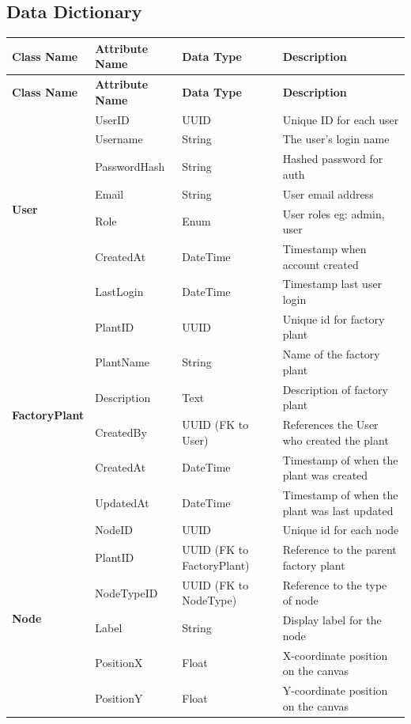 \documentclass[12pt]{article}
\begin{document}
\subsection{Data Dictionary}
\begin{longtable}{|p{3.5cm}|p{3.25cm}|p{2cm}|p{6cm}|}
  \hline
  \textbf{Class Name} & \textbf{Attribute Name} & \textbf{Data Type} & \textbf{Description} \\
  \hline
  \endfirsthead
  
  \hline
  \textbf{Class Name} & \textbf{Attribute Name} & \textbf{Data Type} & \textbf{Description} \\
  \hline
  \endhead
  
  \multirow{7}{*}{\textbf{User}} & UserID & UUID & Unique ID for each user \\
  \cline{2-4}
  & Username & String & The user’s login name \\
  \cline{2-4}
  & PasswordHash & String & Hashed password for auth \\
  \cline{2-4}
  & Email & String & User email address \\
  \cline{2-4}
  & Role & Enum & User roles eg: admin, user \\
  \cline{2-4}
  & CreatedAt & DateTime & Timestamp when account created \\
  \cline{2-4}
  & LastLogin & DateTime & Timestamp last user login \\
  \hline
  
  \multirow{6}{*}{\textbf{FactoryPlant}} & PlantID & UUID & Unique id for factory plant \\
  \cline{2-4}
  & PlantName & String & Name of the factory plant \\
  \cline{2-4}
  & Description & Text & Description of factory plant \\
  \cline{2-4}
  & CreatedBy & UUID (FK to User) & References the User who created the plant \\
  \cline{2-4}
  & CreatedAt & DateTime & Timestamp of when the plant was created \\
  \cline{2-4}
  & UpdatedAt & DateTime & Timestamp of when the plant was last updated \\
  \hline
  
  \multirow{6}{*}{\textbf{Node}} & NodeID & UUID & Unique id for each node \\
  \cline{2-4}
  & PlantID & UUID (FK to FactoryPlant) & Reference to the parent factory plant \\
  \cline{2-4}
  & NodeTypeID & UUID (FK to NodeType) & Reference to the type of node \\
  \cline{2-4}
  & Label & String & Display label for the node \\
  \cline{2-4}
  & PositionX & Float & X-coordinate position on the canvas \\
  \cline{2-4}
  & PositionY & Float & Y-coordinate position on the canvas \\
  \hline
  

\end{longtable}
\end{document}
